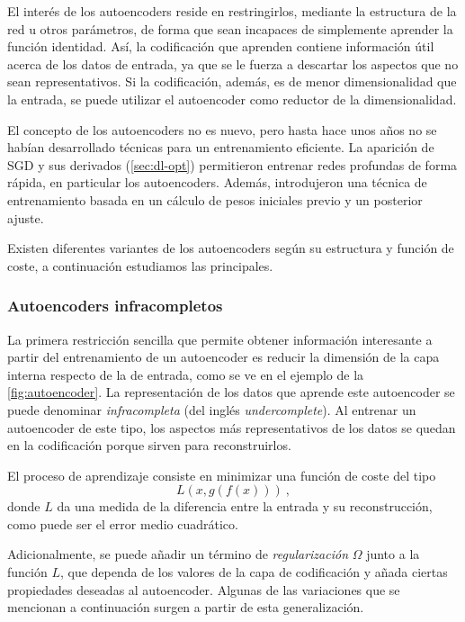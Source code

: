 El interés de los autoencoders reside en restringirlos, mediante la estructura de la red u otros parámetros, de forma que sean incapaces de simplemente aprender la función identidad. Así, la codificación que aprenden contiene información útil acerca de los datos de entrada, ya que se le fuerza a descartar los aspectos que no sean representativos. Si la codificación, además, es de menor dimensionalidad que la entrada, se puede utilizar el autoencoder como reductor de la dimensionalidad.

El concepto de los autoencoders no es nuevo, pero hasta hace unos años no se habían desarrollado técnicas para un entrenamiento eficiente. La aparición de SGD y sus derivados (\autoref{sec:dl-opt}) permitieron entrenar redes profundas de forma rápida, en particular los autoencoders. Además, \textcite{hinton2006autoencoder} introdujeron una técnica de entrenamiento basada en un cálculo de pesos iniciales previo y un posterior ajuste.

Existen diferentes variantes de los autoencoders según su estructura y función de coste, a continuación estudiamos las principales.

\subsubsection{Autoencoders infracompletos}

La primera restricción sencilla que permite obtener información interesante a partir del entrenamiento de un autoencoder es reducir la dimensión de la capa interna respecto de la de entrada, como se ve en el ejemplo de la \autoref{fig:autoencoder}. La representación de los datos que aprende este autoencoder se puede denominar \textit{infracompleta} (del inglés \textit{undercomplete}). Al entrenar un autoencoder de este tipo, los aspectos más representativos de los datos se quedan en la codificación porque sirven para reconstruirlos.

El proceso de aprendizaje consiste en minimizar una función de coste del tipo
\[
  L(x,g(f(x)))~,
\]
donde $L$ da una medida de la diferencia entre la entrada y su reconstrucción, como puede ser el error medio cuadrático.

Adicionalmente, se puede añadir un término de \textit{regularización} $\Omega$ junto a la función $L$, que dependa de los valores de la capa de codificación y añada ciertas propiedades deseadas al autoencoder. Algunas de las variaciones que se mencionan a continuación surgen a partir de esta generalización.

